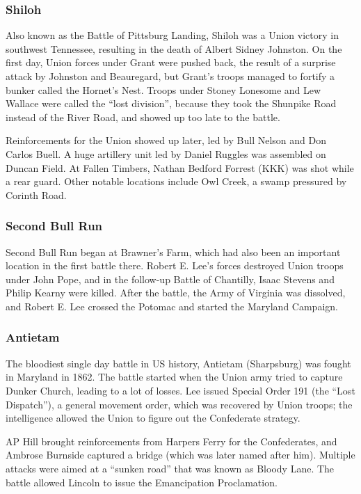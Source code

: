 \subsubsection*{Shiloh}

Also known as the Battle of Pittsburg Landing, Shiloh was a Union victory in southwest Tennessee,
resulting in the death of Albert Sidney Johnston.
On the first day, Union forces under Grant were pushed back,
the result of a surprise attack by Johnston and Beauregard,
but Grant's troops managed to fortify a bunker called the Hornet's Nest.
Troops under Stoney Lonesome and Lew Wallace were called the ``lost division'',
because they took the Shunpike Road instead of the River Road,
and showed up too late to the battle.

Reinforcements for the Union showed up later, led by Bull Nelson and Don Carlos Buell.
A huge artillery unit led by Daniel Ruggles was assembled on Duncan Field.
At Fallen Timbers, Nathan Bedford Forrest (KKK) was shot while a rear guard.
Other notable locations include Owl Creek, a swamp pressured by Corinth Road.

\subsubsection*{Second Bull Run}

Second Bull Run began at Brawner's Farm, which had also been an important location in the first battle there.
Robert E. Lee's forces destroyed Union troops under John Pope,
and in the follow-up Battle of Chantilly, Isaac Stevens and Philip Kearny were killed.
After the battle, the Army of Virginia was dissolved,
and Robert E. Lee crossed the Potomac and started the Maryland Campaign.

\subsubsection*{Antietam}

The bloodiest single day battle in US history, Antietam (Sharpsburg) was fought in Maryland in 1862.
The battle started when the Union army tried to capture Dunker Church, leading to a lot of losses.
Lee issued Special Order 191 (the ``Lost Dispatch''),
a general movement order, which was recovered by Union troops;
the intelligence allowed the Union to figure out the Confederate strategy.

AP Hill brought reinforcements from Harpers Ferry for the Confederates,
and Ambrose Burnside captured a bridge (which was later named after him).
Multiple attacks were aimed at a ``sunken road'' that was known as Bloody Lane.
The battle allowed Lincoln to issue the Emancipation Proclamation.

